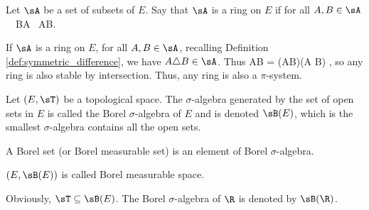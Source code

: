 \begin{definition}\label{def:ring_set}
Let $\sA$ be a set of subsets of $E$. Say that $\sA$ is a ring on $E$ if for all $A,B\in \sA$
\be
{}\ \emptyset\in \sA \quad\quad {}\ B\bs A \in\sA \quad\quad {}\ A\cup B\in \sA .
\ee
\end{definition}

\begin{remark}
If $\sA$ is a ring on $E$, for all $A,B\in\sA$, recalling Definition \ref{def:symmetric_difference}, we have $A\triangle B \in \sA$. Thus
\be
A\cap B = (A\cup B)\bs (A \triangle B) \in \sA,
\ee
so any ring is also stable by intersection. Thus, any ring is also a $\pi$-system.
\end{remark}

\begin{definition}\label{def:borel_measurable_space}
Let $(E,\sT)$ be a topological space. The $\sigma$-algebra generated by the set of open sets in $E$ is called the Borel $\sigma$-algebra of $E$ and is denoted $\sB(E)$, which is the smallest $\sigma$-algebra contains all the open sets.

A Borel set (or Borel measurable set) is an element of Borel $\sigma$-algebra.

$(E,\sB(E))$ is called Borel measurable space.
\end{definition}
\begin{remark}
Obviously, $\sT\subseteq \sB(E)$. The Borel $\sigma$-algebra of $\R$ is denoted by $\sB(\R)$.
\end{remark}

